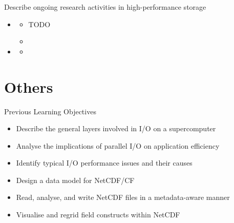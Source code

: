 \documentclass[compress,11pt,xcolor=svgnames,aspectratio=169]{beamer}
\begin{document}
\begin{frame}[t]{Describe ongoing research activities in high-performance storage}

\begin{itemize}

  \item
    \begin{itemize}
        \item TODO
        \item
    \end{itemize}
  \item
    \begin{itemize}
      \item
    \end{itemize}
\end{itemize}

\end{frame}


\section{Others}

\begin{frame}[t]{Previous Learning Objectives}

\begin{itemize}

    \item Describe the general layers involved in I/O on a supercomputer
    \item Analyse the implications of parallel I/O on application efficiency
    \item Identify typical I/O performance issues and their causes
    \item Design a data model for NetCDF/CF
    \item Read, analyse, and write NetCDF files in a metadata-aware manner
    \item Visualise and regrid field constructs within NetCDF

\end{itemize}

\end{frame}

\acknowledgement
\end{document}
